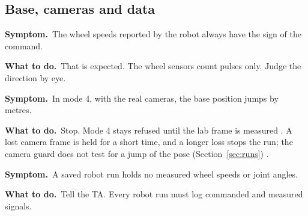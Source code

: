 \documentclass[11pt]{article}
\newif\ifshowsrc
\newcommand{\src}[1]{\ifshowsrc{\scriptsize\,[\texttt{\romecode{#1}}]}\fi}
\newcommand{\sym}{\textbf{Symptom.}\ }
\newcommand{\act}{\par\textbf{What to do.}\ }
\begin{document}
\subsection*{Base, cameras and data}
\begin{trouble}[resume]
  \item \sym The wheel speeds reported by the robot always have the sign of the command.
  \act That is expected. The wheel sensors count pulses only. Judge the direction by eye.
  \item \sym In mode 4, with the real cameras, the base position jumps by metres.
  \act Stop. Mode 4 stays refused until the lab frame is measured \src{lab_settings.m:44-48}. A lost camera frame is
  held for a short time, and a longer loss stops the run; the camera guard does not test for a jump of the pose
  (Section~\ref{sec:runs}) \src{camera_guard_core.m:16-19}.
  \item \sym A saved robot run holds no measured wheel speeds or joint angles.
  \act Tell the TA. Every robot run must log commanded and measured signals. \src{docs/lab/PART_F_BENCH_CHECKLIST.md item 27}
\end{trouble}
\end{document}
